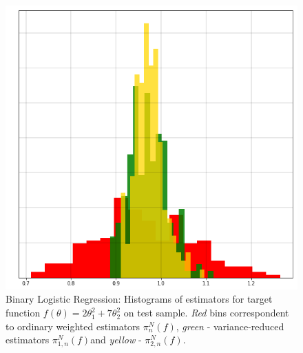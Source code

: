 \documentclass[article]{elsarticle}
\begin{document}
\begin{figure}[h]
\begin{center}
\includegraphics[height=0.5\textwidth]{pictures/blr_2d_test.png}
\caption{\label{fig:blr} Binary Logistic Regression: Histograms of estimators for target function $f(\theta) = 2 \theta_1^2 + 7 \theta_2^2$ on test sample. \textit{Red} bins correspondent to ordinary weighted estimators $\pi^N_n(f)$, \textit{green} - variance-reduced estimators $\pi^N_{1,n}(f)$and \textit{yellow} - $\pi^N_{2,n}(f)$.}
\end{center}
\end{figure}
\end{document}
